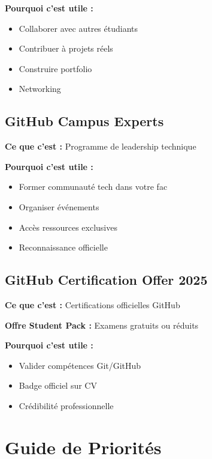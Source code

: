 \documentclass[11pt,a4paper]{article}
\begin{document}
\textbf{Pourquoi c'est utile :}
\begin{itemize}
    \item Collaborer avec autres étudiants
    \item Contribuer à projets réels
    \item Construire portfolio
    \item Networking
\end{itemize}

\subsection{GitHub Campus Experts}

\textbf{Ce que c'est :} Programme de leadership technique

\textbf{Pourquoi c'est utile :}
\begin{itemize}
    \item Former communauté tech dans votre fac
    \item Organiser événements
    \item Accès ressources exclusives
    \item Reconnaissance officielle
\end{itemize}

\subsection{GitHub Certification Offer 2025}

\textbf{Ce que c'est :} Certifications officielles GitHub

\textbf{Offre Student Pack :} Examens gratuits ou réduits

\textbf{Pourquoi c'est utile :}
\begin{itemize}
    \item Valider compétences Git/GitHub
    \item Badge officiel sur CV
    \item Crédibilité professionnelle
\end{itemize}

\newpage
\section{Guide de Priorités}
\end{document}
